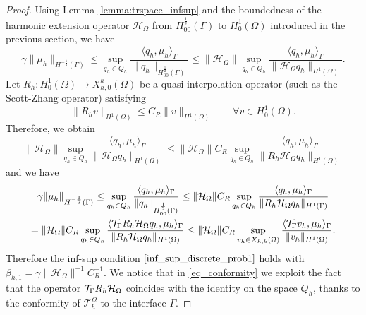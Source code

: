 \begin{proof}
Using Lemma \ref{lemma:trspace_infsup} and the boundedness of the harmonic extension operator $\mathcal{H}_\Omega$ from $H^{\frac 12}_{00}(\Gamma)$ to $H^1_0(\Omega)$ introduced in the previous section, we have
\begin{equation*}
\gamma \|\mu_h\|_{H^{-\frac 12}(\Gamma)} \leq  \sup_{q_h \in Q_h} \frac{ \langle q_h, \mu_h \rangle _{\Gamma} } {\|q_h\|_{H^{\frac 12}_{00}(\Gamma)}} 
\leq 
\|\mathcal{H}_\Omega\| \sup_{q_h \in Q_h} \frac{ \langle q_h, \mu_h \rangle _{\Gamma} } {\|\mathcal{H}_\Omega q_h\|_{H^1(\Omega)}} .
\end{equation*}
Let $R_h: H^1_0(\Omega) \rightarrow X_{h,0}^k(\Omega)$ be a quasi interpolation operator (such as the Scott-Zhang operator) satisfying 
\begin{equation*}
\|R_h v\|_{H^1(\Omega)} \leq C_R \|v\|_{H^1(\Omega)} \qquad \forall v \in H^1_0(\Omega).
\end{equation*}
Therefore, we obtain 
\begin{equation*}
\|\mathcal{H}_\Omega\| \sup_{q_h \in Q_h} \frac{ \langle q_h, \mu_h \rangle _{\Gamma} } {\|\mathcal{H}_\Omega q_h\|_{H^1(\Omega)}} 
\leq
\|\mathcal{H}_{\Omega}\| C_R \sup_{q_h \in Q_h} \frac{ \langle q_h, \mu_h \rangle _{\Gamma} } {\|R_h \mathcal{H}_{\Omega} q_h\|_{H^1(\Omega)}}
\end{equation*}
and we have
\begin{multline}\label{eq_conformity}
\gamma \|\mu_h\|_{H^{-\frac 12}(\Gamma)} 
\leq 
\sup_{q_h \in Q_h} \frac{ \langle q_h, \mu_h \rangle_{\Gamma} } {\|q_h\|_{H^{\frac 12}_{00}(\Gamma)}} 
\leq
\|\mathcal{H}_{\Omega}\| C_R \sup_{q_h \in Q_h} \frac{ \langle q_h, \mu_h \rangle_{\Gamma} } {\|R_h \mathcal{H}_{\Omega} q_h\|_{H^1(\Gamma)}}
\\
=
\|\mathcal{H}_{\Omega}\| C_R \sup_{q_h \in Q_h} \frac{ \langle \trace R_h  \mathcal{H}_{\Omega}q_h, \mu_h \rangle_{\Gamma} } {\|R_h \mathcal{H}_{\Omega} q_h\|_{H^1(\Omega)}} 
\leq \|\mathcal{H}_{\Omega}\| C_R \sup_{v_h \in X_{h,k}(\Omega)} \frac{ \langle \trace v_h, \mu_h \rangle_{\Gamma} } {\|v_h\|_{H^1(\Omega)}}. 
\end{multline}
Therefore the inf-sup condition $\eqref{inf_sup_discrete_prob1}$ holds with $\beta_{h,1} = \gamma \|\mathcal{H}_{\Omega}\|^{-1} C_R^{-1} $. We notice that in \eqref{eq_conformity} we exploit the fact that the operator ${\mathcal{T}_\Gamma} R_h  \mathcal{H}_{\Omega}$ coincides with the identity on the space $Q_h$, thanks to the conformity of $\mathcal{T}^{\Omega}_h$ to the interface $\Gamma$.
\end{proof}

